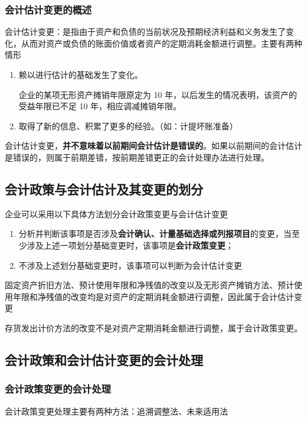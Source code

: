 \documentclass[UTF8,12pt]{ctexart}
\numberwithin{equation}{section} %
\numberwithin{figure}{section}
\numberwithin{table}{section}
\begin{document}
	\subsubsection{会计估计变更的概述}
	会计估计变更：是指由于资产和负债的当前状况及预期经济利益和义务发生了变化，从而对资产或负债的账面价值或者资产的定期消耗金额进行调整。主要有两种情形
	\begin{enumerate}
		\item 赖以进行估计的基础发生了变化。
		
		企业的某项无形资产摊销年限原定为 10 年，以后发生的情况表明，该资产的受益年限已不足 10 年，相应调减摊销年限。
		
		\item 取得了新的信息、积累了更多的经验。（如：计提坏账准备）
	\end{enumerate}
	
	会计估计变更，\textbf{并不意味着以前期间会计估计是错误的}。如果以前期间的会计估计是错误的，则属于前期差错，按前期差错更正的会计处理办法进行处理。
	
	\subsection{会计政策与会计估计及其变更的划分}
	企业可以采用以下具体方法划分会计政策变更与会计估计变更
	\begin{enumerate}
		\item 分析并判断该事项是否涉及\textbf{会计确认、计量基础选择或列报项目}的变更，当至少涉及上述一项划分基础变更时，该事项是\textbf{会计政策变更}；
		
		\item 不涉及上述划分基础变更时，该事项可以判断为会计估计变更
	\end{enumerate}
	
	固定资产折旧方法、预计使用年限和净残值的改变以及无形资产摊销方法、预计使用年限和净残值的改变均是对资产的定期消耗金额进行调整，因此属于会计估计变更
	
	存货发出计价方法的改变不是对资产定期消耗金额进行调整，属于会计政策变更。
	
	\subsection{会计政策和会计估计变更的会计处理}
	\subsubsection{会计政策变更的会计处理}
	会计政策变更处理主要有两种方法：追溯调整法、未来适用法
	
\end{document}
